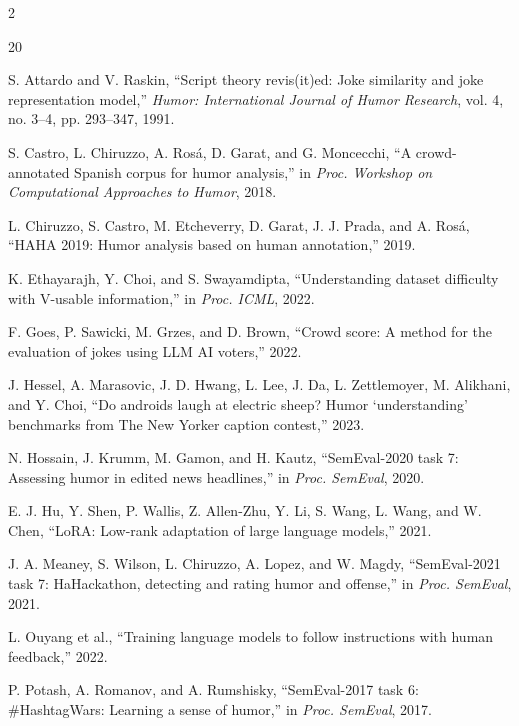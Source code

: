 \documentclass[10pt, a4paper]{article}
\begin{document}
\begin{multicols}{2}
\begin{thebibliography}{20}
\small

S. Attardo and V. Raskin, ``Script theory revis(it)ed: Joke similarity and joke representation model,'' \textit{Humor: International Journal of Humor Research}, vol. 4, no. 3--4, pp. 293--347, 1991.

S. Castro, L. Chiruzzo, A. Ros\'{a}, D. Garat, and G. Moncecchi, ``A crowd-annotated Spanish corpus for humor analysis,'' in \textit{Proc. Workshop on Computational Approaches to Humor}, 2018.

L. Chiruzzo, S. Castro, M. Etcheverry, D. Garat, J. J. Prada, and A. Ros\'{a}, ``HAHA 2019: Humor analysis based on human annotation,'' 2019.

K. Ethayarajh, Y. Choi, and S. Swayamdipta, ``Understanding dataset difficulty with V-usable information,'' in \textit{Proc. ICML}, 2022.

F. Goes, P. Sawicki, M. Grzes, and D. Brown, ``Crowd score: A method for the evaluation of jokes using LLM AI voters,'' 2022.

J. Hessel, A. Marasovic, J. D. Hwang, L. Lee, J. Da, L. Zettlemoyer, M. Alikhani, and Y. Choi, ``Do androids laugh at electric sheep? Humor `understanding' benchmarks from The New Yorker caption contest,'' 2023.

N. Hossain, J. Krumm, M. Gamon, and H. Kautz, ``SemEval-2020 task 7: Assessing humor in edited news headlines,'' in \textit{Proc. SemEval}, 2020.

E. J. Hu, Y. Shen, P. Wallis, Z. Allen-Zhu, Y. Li, S. Wang, L. Wang, and W. Chen, ``LoRA: Low-rank adaptation of large language models,'' 2021.

J. A. Meaney, S. Wilson, L. Chiruzzo, A. Lopez, and W. Magdy, ``SemEval-2021 task 7: HaHackathon, detecting and rating humor and offense,'' in \textit{Proc. SemEval}, 2021.

L. Ouyang et al., ``Training language models to follow instructions with human feedback,'' 2022.

P. Potash, A. Romanov, and A. Rumshisky, ``SemEval-2017 task 6: \#HashtagWars: Learning a sense of humor,'' in \textit{Proc. SemEval}, 2017.


\end{thebibliography}
\end{multicols}
\end{document}
